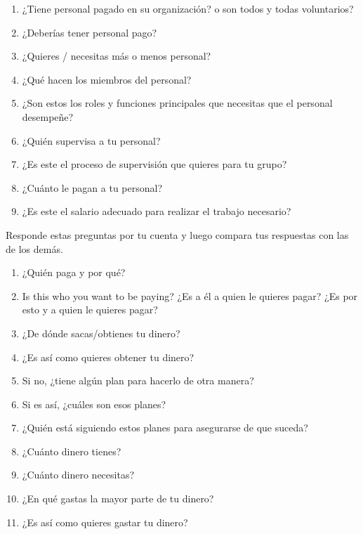 \begin{enumerate}

\item
  ¿Tiene personal pagado en su organización?
  o son todos y todas voluntarios?

\item
  ¿Deberías tener personal pago?

\item
  ¿Quieres / necesitas más o menos personal?

\item
  ¿Qué hacen los miembros del personal?

\item
  ¿Son estos los roles y funciones principales que necesitas que el personal desempeñe?

\item
  ¿Quién supervisa a tu personal?

\item
  ¿Es este el proceso de supervisión que quieres para tu grupo?

\item
  ¿Cuánto le pagan a tu personal?

\item
  ¿Es este el salario adecuado para realizar el trabajo necesario?

\end{enumerate}


Responde estas preguntas por tu cuenta y
luego compara tus respuestas con las de los demás.

\begin{enumerate}

\item
  ¿Quién paga y por qué?

\item
  Is this who you want to be paying?
  ¿Es a él a quien le quieres pagar?
  ¿Es por esto y a quien le quieres pagar?

\item
  ¿De dónde sacas/obtienes tu dinero?

\item
  ¿Es así como quieres obtener tu dinero?

\item
  Si no, ¿tiene algún plan para hacerlo de otra manera?

\item
  Si es así, ¿cuáles son esos planes?

\item
  ¿Quién está siguiendo estos planes para asegurarse de que suceda?

\item
  ¿Cuánto dinero tienes?

\item
  ¿Cuánto dinero necesitas?

\item
  ¿En qué gastas la mayor parte de tu dinero?

\item
  ¿Es así como quieres gastar tu dinero?

\end{enumerate}

